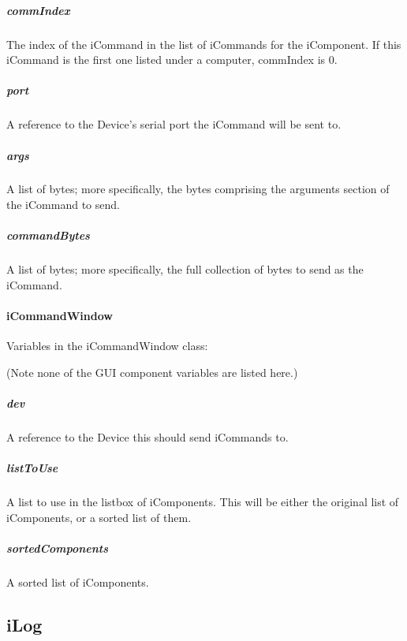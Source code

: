 \documentclass[12pt,letterpaper]{article}
\begin{document}
%
%
\subparagraph{commIndex}
\label{4.5.2.0.7}

The index of the iCommand in the list of iCommands for the iComponent. If this iCommand is the first one listed under a computer, commIndex is 0.



%
%
\subparagraph{port}
\label{4.5.2.0.8}

A reference to the Device's serial port the iCommand will be sent to.



%
%
\subparagraph{args}
\label{4.5.2.0.9}

A list of bytes; more specifically, the bytes comprising the arguments section of the iCommand to send.



%
%
\subparagraph{commandBytes}
\label{4.5.2.0.10}

A list of bytes; more specifically, the full collection of bytes to send as the iCommand.



%
%
\paragraph{iCommandWindow}
\label{4.5.2.1}

Variables in the iCommandWindow class:

(Note none of the GUI component variables are listed here.)

\setcounter{subparagraph}{-1}



%
%
\subparagraph{dev}
\label{4.5.2.1.0}

A reference to the Device this should send iCommands to.



%
%
\subparagraph{listToUse}
\label{4.5.2.1.1}

A list to use in the listbox of iComponents. This will be either the original list of iComponents, or a sorted list of them.



%
%
\subparagraph{sortedComponents}
\label{4.5.2.1.2}

A sorted list of iComponents.



%
%
\subsection{iLog}
\label{4.6}
\end{document}
